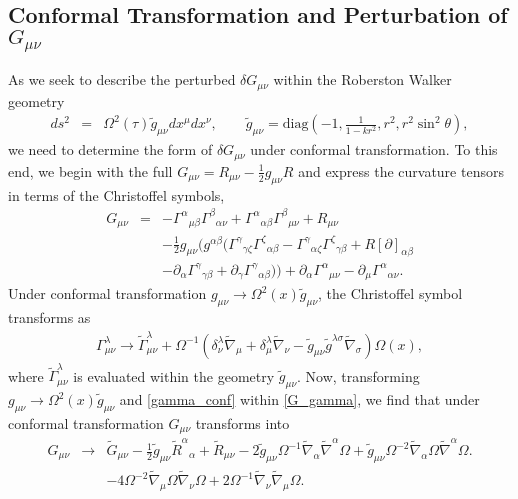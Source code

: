 \subsection{Conformal Transformation and Perturbation of $G_{\mu\nu}$}
As we seek to describe the perturbed $\delta G_{\mu\nu}$ within the Roberston Walker geometry
\begin{eqnarray}
ds^2 &=& \Omega^2(\tau)\tilde g_{\mu\nu} dx^\mu dx^\nu,\qquad 
\tilde g_{\mu\nu} = \text{diag}\left(-1,\frac{1}{1-kr^2},r^2,r^2\sin^2\theta\right),
\label{ac_rw_metric}
\end{eqnarray}
we need to determine the form of $\delta G_{\mu\nu}$ under conformal transformation. To this end, we begin with the full $G_{\mu\nu} = R_{\mu\nu} - \tfrac12 g_{\mu\nu} R$ and express the curvature tensors in terms of the Christoffel symbols,
\begin{eqnarray}
G_{\mu\nu} &=& - \Gamma^{\alpha }{}_{\mu \beta } \Gamma^{\beta }{}_{\alpha \nu } + \Gamma^{\alpha }{}_{\alpha \beta } \Gamma^{\beta }{}_{\mu \nu } + R_{\mu \nu } \nonumber \\ 
&& -  \tfrac{1}{2} g_{\mu \nu } \bigl(g^{\alpha \beta } (\Gamma^{\gamma }{}_{\gamma \zeta } \Gamma^{\zeta }{}_{\alpha \beta } -  \Gamma^{\gamma }{}_{\alpha \zeta } \Gamma^{\zeta }{}_{\gamma \beta } + R[\partial ]_{\alpha \beta }
\nonumber\\
&& -  \partial_{\alpha }\Gamma^{\gamma }{}_{\gamma \beta } + \partial_{\gamma }\Gamma^{\gamma }{}_{\alpha \beta })\bigr) + \partial_{\alpha }\Gamma^{\alpha }{}_{\mu \nu } -  \partial_{\mu }\Gamma^{\alpha }{}_{\alpha \nu }.
\label{G_gamma}
\end{eqnarray}
Under conformal transformation $g_{\mu\nu} \to \Omega^2(x)\tilde g_{\mu\nu}$, the Christoffel symbol transforms as
\begin{eqnarray}
\Gamma^{\lambda}_{\mu\nu} \to \tilde\Gamma^{\lambda}_{\mu\nu} + \Omega^{-1}(\delta^\lambda_\nu \tilde \nabla_\mu + \delta^\lambda_\mu \tilde\nabla_\nu - \tilde g_{\mu\nu}  \tilde g^{\lambda\sigma}\tilde \nabla_\sigma)\Omega(x),
\label{gamma_conf}
\end{eqnarray}
where $\tilde \Gamma^\lambda_{\mu\nu}$ is evaluated within the geometry $\tilde g_{\mu\nu}$. Now, transforming $g_{\mu\nu} \to \Omega^2(x)\tilde g_{\mu\nu}$ and \eqref{gamma_conf} within \eqref{G_gamma}, we find that under conformal transformation $G_{\mu\nu}$ transforms into
\begin{eqnarray}
G_{\mu\nu} &\to& \tilde G_{\mu\nu} - \tfrac{1}{2} \tilde g_{\mu \nu } \tilde R^{\alpha }{}_{\alpha } + \tilde R_{\mu \nu } - 2 \tilde g_{\mu \nu } \Omega^{-1} \tilde \nabla_{\alpha }\tilde \nabla^{\alpha }\Omega + \tilde g_{\mu \nu } \Omega^{-2} \tilde \nabla_{\alpha }\Omega \tilde\nabla^{\alpha }\Omega. 
\nonumber\\
 &&- 4 \Omega^{-2} \tilde \nabla_{\mu }\Omega \tilde\nabla_{\nu }\Omega + 2 \Omega^{-1} \tilde \nabla_{\nu }\tilde \nabla_{\mu }\Omega .
\end{eqnarray}
